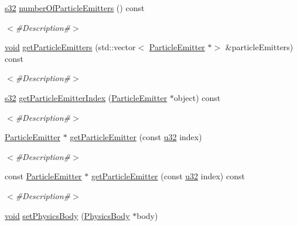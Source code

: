 \begin{DoxyCompactItemize}
\mbox{\hyperlink{_util_8h_aa62c75d314a0d1f37f79c4b73b2292e2}{s32}} \mbox{\hyperlink{classnjli_1_1_node_afaa6e4db3fe249da19459772f20d9aa9}{number\+Of\+Particle\+Emitters}} () const
\begin{DoxyCompactList}\small\item\em $<$\#\+Description\#$>$ \end{DoxyCompactList}\item 
\mbox{\hyperlink{_thread_8h_af1e856da2e658414cb2456cb6f7ebc66}{void}} \mbox{\hyperlink{classnjli_1_1_node_a10b57ef7a912c5b743def293a9aafeff}{get\+Particle\+Emitters}} (std\+::vector$<$ \mbox{\hyperlink{classnjli_1_1_particle_emitter}{Particle\+Emitter}} $\ast$$>$ \&particle\+Emitters) const
\begin{DoxyCompactList}\small\item\em $<$\#\+Description\#$>$ \end{DoxyCompactList}\item 
\mbox{\hyperlink{_util_8h_aa62c75d314a0d1f37f79c4b73b2292e2}{s32}} \mbox{\hyperlink{classnjli_1_1_node_a44cf22fb6896a874bfa7eb4eb3b2122e}{get\+Particle\+Emitter\+Index}} (\mbox{\hyperlink{classnjli_1_1_particle_emitter}{Particle\+Emitter}} $\ast$object) const
\begin{DoxyCompactList}\small\item\em $<$\#\+Description\#$>$ \end{DoxyCompactList}\item 
\mbox{\hyperlink{classnjli_1_1_particle_emitter}{Particle\+Emitter}} $\ast$ \mbox{\hyperlink{classnjli_1_1_node_a863bf04366e0aeb8ac67fb062b7f9296}{get\+Particle\+Emitter}} (const \mbox{\hyperlink{_util_8h_a10e94b422ef0c20dcdec20d31a1f5049}{u32}} index)
\begin{DoxyCompactList}\small\item\em $<$\#\+Description\#$>$ \end{DoxyCompactList}\item 
const \mbox{\hyperlink{classnjli_1_1_particle_emitter}{Particle\+Emitter}} $\ast$ \mbox{\hyperlink{classnjli_1_1_node_a5c98aa47fcea68502023ac465951d8cf}{get\+Particle\+Emitter}} (const \mbox{\hyperlink{_util_8h_a10e94b422ef0c20dcdec20d31a1f5049}{u32}} index) const
\begin{DoxyCompactList}\small\item\em $<$\#\+Description\#$>$ \end{DoxyCompactList}\item 
\mbox{\hyperlink{_thread_8h_af1e856da2e658414cb2456cb6f7ebc66}{void}} \mbox{\hyperlink{classnjli_1_1_node_a53df21090a93628066b4fd351317a36b}{set\+Physics\+Body}} (\mbox{\hyperlink{classnjli_1_1_physics_body}{Physics\+Body}} $\ast$body)
$$
\end{DoxyCompactItemize}
